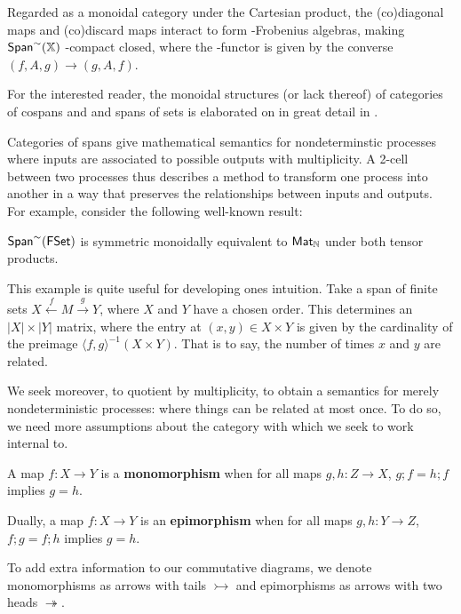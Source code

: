  Regarded as a monoidal category under the Cartesian product, the (co)diagonal maps and (co)discard maps interact to form \dag-Frobenius algebras, making  $\mathsf{Span}^\sim(\mathbb{X})$  \dag-compact closed, where the \dag-functor is given by the converse  $(f,A,g)\to (g,A,f)$.



For the interested reader, the monoidal structures (or lack thereof) of categories of cospans and and spans of sets is elaborated on in great detail in \cite{bruni}.

Categories of spans give mathematical semantics for nondeterminstic processes where inputs are associated to possible outputs with multiplicity. 
A 2-cell between two processes thus describes a method to transform one process into another in a way that preserves the relationships between inputs and outputs.  For example, consider the following well-known result:



\begin{example}
$\mathsf{Span}^\sim(\mathsf{FSet})$ is symmetric monoidally equivalent to $\mathsf{Mat}_{\mathbb{N}}$ under both tensor products.
\end{example}

This example is quite useful for developing ones intuition.  Take a span of finite sets $X\xleftarrow{f} M \xrightarrow{g} Y$, where $X$ and $Y$ have a chosen order. This determines an $|X|\times |Y|$ matrix, where the entry at $(x,y)\in X\times Y$ is given by the cardinality of the preimage $\langle f,g\rangle^{-1}(X\times Y)$.  That is to say, the number of times $x$ and $y$ are related.



We seek moreover, to quotient by multiplicity, to obtain a semantics for merely nondeterministic processes: where things can be related at most once.  To do so, we need more assumptions about the category with which we seek to work internal to.

\begin{definition}
A map $f:X\to Y$ is a {\bf monomorphism} when for all maps $g,h:Z\to X$, $g;f=h;f$ implies $ g=h$.

Dually, a map $f:X\to Y$ is an {\bf epimorphism} when for all maps $g,h:Y\to Z$, $f;g=f;h$ implies $ g=h$.

To add extra information to our commutative diagrams, we denote monomorphisms as arrows with tails $\rightarrowtail$ and epimorphisms as arrows with two heads $\twoheadrightarrow$.  
\end{definition}

